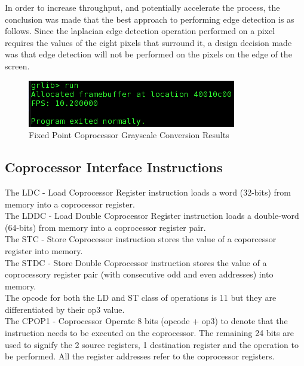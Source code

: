 \documentclass{article}
\begin{document}
In order to increase throughput, and potentially accelerate the process, the conclusion was made that the best approach to performing edge detection is as follows. Since the laplacian edge detection operation performed on a pixel requires the values of the eight pixels that surround it, a design decision made was that edge detection will not be performed on the pixels on the edge of the screen. 

	 \begin{figure}[H]
	 	\begin{center}
	 		\includegraphics[scale=0.6]{../part5_files/Fixed_point_greyscale_coprocessor_results.png}
	 		\caption{Fixed Point Coprocessor Grayscale Conversion Results}
	 	\end{center}
	 \end{figure}

\subsection{Coprocessor Interface Instructions}
	The LDC - Load Coprocessor Register instruction loads a word (32-bits) from memory into a coprocessor register.\\
	
	The LDDC - Load Double Coprocessor Register instruction loads a double-word (64-bits) from memory into a coprocessor register pair.\\
	
	The STC - Store Coprocessor instruction stores the value of a coporcessor register into memory.\\
	
	The STDC - Store Double Coprocessor instruction stores the value of a coprocessory register pair (with consecutive odd and even addresses) into memory.\\
	
	The opcode for both the LD and ST class of operations is 11 but they are differentiated by their op3 value.\\
	
	The CPOP1 - Coprocessor Operate 8 bits (opcode + op3) to denote that the instruction needs to be executed on the coprocessor. The remaining 24 bits are used to signify the 2 source registers, 1 destination register and the operation to be performed. All the register addresses refer to the coprocessor registers.
\end{document}
